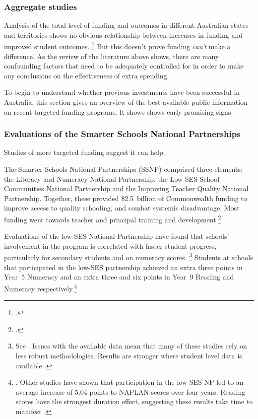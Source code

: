 \documentclass{grattan}
\begin{document}
\subsubsection{Aggregate studies}\label{subsubsec:aggregate-studies}
Analysis of the total level of funding and outcomes in different Australian states and territories shows no obvious relationship between increases in funding and improved student outcomes.%
\footcite{Jensen2016SchoolFunding}
But this doesn't prove funding \emph{can't} make a difference. As the review of the literature above shows, there are many confounding factors that need to be adequately controlled for in order to make any conclusions on the effectiveness of extra spending.

To begin to understand whether previous investments have been successful in Australia, this section gives an overview of the best available public information on recent targeted funding programs. It shows shows early promising signs.

\subsubsection{Evaluations of the Smarter Schools National Partnerships}\label{subsubsec:the-smarter-schools-national-partnerships}
Studies of more targeted funding suggest it can help.

The Smarter Schools National Partnerships (SSNP) comprised three elements: the Literacy and Numeracy National Partnership, the Low-SES School Communities National Partnership and the Improving Teacher Quality National Partnership.
Together, these provided \$2.5~billion of Commonwealth funding to improve access to quality schooling, and combat systemic disadvantage. Most funding went towards teacher and principal training and development.\footcites{Helal2012SchoolResourcesAutonomy}{PGA2014NationalEvaluationLow}

Evaluations of the low-SES National Partnership have found that schools' involvement in the program is correlated with faster student progress, particularly for secondary students and on numeracy scores.%
\footnote{See \textcites{CIRES2015LowSESSchool}{Helal2012SchoolResourcesAutonomy}{Huo2016EffectiveStrategiesImproving}{PGA2014NationalEvaluationLow}. Issues with the available data mean that many of these studies rely on less robust methodologies. Results are stronger where student level data is available \textcite[][10]{PGA2014NationalEvaluationLow}.}
Students at schools that participated in the low-SES partnership achieved an extra three points in Year~5 Numeracy and an extra three and six points in Year~9 Reading and Numeracy respectively.\footnote{\textcite{Huo2016EffectiveStrategiesImproving}. Other studies have shown that participation in the low-SES NP led to an average increase of 5.04 points to NAPLAN scores over four years. Reading scores have the strongest duration effect, suggesting these results take time to manifest \textcite[][71]{CIRES2015LowSESSchool}.}\citetrackerfalse
\end{document}
